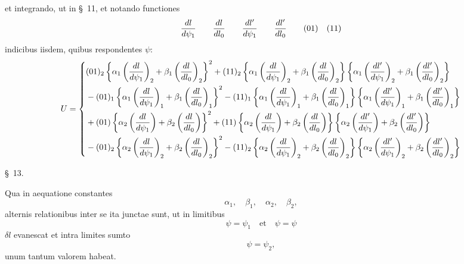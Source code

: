 et integrando, ut in \S\ 11, et notando functiones
\[
 {dl\over d\psi_1}\qquad {dl\over dl_0}\qquad {dl'\over d\psi_1}\qquad {dl'\over dl_0}\qquad (01)\quad (11)
\]
indicibus iisdem, quibus respondentes $\psi$:
\begingroup\scriptsize
\[
\begin{aligned}
U=\left\{\begin{aligned}
&(01)_2\left\{\alpha_1\left({dl\over d\psi_1}\right)_2+\beta_1\left({dl\over dl_0}\right)_2\right\}^2
 +(11)_2\left\{\alpha_1\left({dl\over d\psi_1}\right)_2+\beta_1\left({dl\over dl_0}\right)_2\right\}
 \left\{\alpha_1\left({dl'\over d\psi_1}\right)_2+\beta_1\left({dl'\over dl_0}\right)_2\right\}\\
&-(01)_1\left\{\alpha_1\left({dl\over d\psi_1}\right)_1+\beta_1\left({dl\over dl_0}\right)_1\right\}^2
 -(11)_1\left\{\alpha_1\left({dl\over d\psi_1}\right)_1+\beta_1\left({dl\over dl_0}\right)_1\right\}
 \left\{\alpha_1\left({dl'\over d\psi_1}\right)_1+\beta_1\left({dl'\over dl_0}\right)_1\right\}\\
&+(01)\left\{\alpha_2\left({dl\over d\psi_1}\right)+\beta_2\left({dl\over dl_0}\right)\right\}^2
 +(11)\left\{\alpha_2\left({dl\over d\psi_1}\right)+\beta_2\left({dl\over dl_0}\right)\right\}
 \left\{\alpha_2\left({dl'\over d\psi_1}\right)+\beta_2\left({dl'\over dl_0}\right)\right\}\\
&-(01)_2\left\{\alpha_2\left({dl\over d\psi_1}\right)_2+\beta_2\left({dl\over dl_0}\right)_2\right\}^2
 -(11)_2\left\{\alpha_2\left({dl\over d\psi_1}\right)_2+\beta_2\left({dl\over dl_0}\right)_2\right\}
 \left\{\alpha_2\left({dl'\over d\psi_1}\right)_2+\beta_2\left({dl'\over dl_0}\right)_2\right\}
\end{aligned}\right.
\end{aligned}
\]
\endgroup

\begin{center}\S\ 13.\end{center}

Qua in aequatione constantes
\[
 \alpha_1,\quad \beta_1,\quad \alpha_2,\quad \beta_2,
\]
alternis relationibus inter se ita junctae sunt, ut in limitibus
\[
 \psi=\psi_1 \quad\text{et}\quad \psi=\psi
\]
$\delta l$ evanescat et intra limites sumto
\[
 \psi=\psi_2,
\]
unum tantum valorem habeat.

